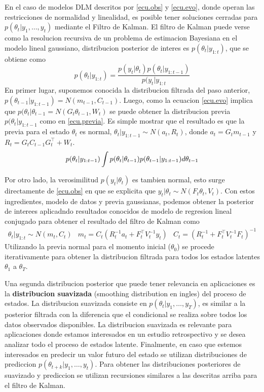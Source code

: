 \documentclass[12pt]{article}\usepackage[]{graphicx}\usepackage[]{color}
\begin{document}
En el caso de modelos DLM descritos por \eqref{ecu.obs} y \eqref{ecu.evo}, donde operan las restricciones de normalidad y linealidad, es posible tener soluciones cerradas para $p(\theta_t | y_1, \ldots, y_t)$ mediante el Filtro de Kalman. El filtro de Kalman puede verse como la resolucion recursiva de un problema de estimacion Bayesiana en el modelo lineal gaussiano, distribucion posterior de interes es $p(\theta_t | y_{1:t} )$, que se obtiene como
\[
p(\theta_t | y_{1:t}) = \frac{ p(y_t | \theta_t) p(\theta_{t} | y_{1:t-1})}{ p(y_t | y_{1:t}  }
\]
En primer lugar, suponemos conocida la distribucion filtrada del paso anterior, $p(\theta_{t-1} | y_{1:t-1}) = N(m_{t-1}, C_{t-1})$. Luego, como la ecuacion \eqref{ecu.evo} implica que $ p(\theta_{t} | \theta_{t-1} = N(G_t\theta_{t-1}, W_t)$ se puede obtener la distribucion previa $p(\theta_{t} | y_{1:t-1}$ como en \eqref{ecu.previa}. Es simple mostrar que el resultado es que la previa para el estado $\theta_t$ es normal, $\theta_t |y_{1:t-1} \sim N(a_t, R_t)$, donde $a_t = G_tm_{t-1}$ y $R_t = G_t C_{t-1} G_t^{\top} + W_t$. 
\begin{equation}
p(\theta_{t} | y_{1:t-1})  \int  p(\theta_{t} | \theta_{t-1}) p( \theta_{t-1}|y_{1:t-1}) d\theta_{t-1} \\
\label{ecu.previa}
\end{equation}

Por otro lado, la verosimilitud $p(y_t | \theta_t)$ es tambien normal, esto surge directamente de \eqref{ecu.obs} en que se explicita que $y_t | \theta_t \sim N(F_t \theta_t, V_t)$. Con estos ingredientes, modelo de datos y previa gaussianas, podemos obtener la posterior de interees aplicadndo resultados conocidos de modelo de regresion lineal conjugado para obtener el resultado del filtro de Kalman como 
\[\begin{array}{ccc}
\theta_t | y_{1:t} \sim N(m_t, C_t) & m_t = C_t( R_t^{-1}a_t + F_t^{\top}V_t^{-1}y_t ) & C_t = (R_t^{-1} + F_t^{\top}V_t^{-1}F_t)^{-1}
\end{array}
\]
Utilizando la previa normal para el momento inicial ($\theta_0$) se procede iterativamente para obtener la distribucion filtrada para todos los estados latentes $\theta_1$ a $\theta_T$. 

Una segunda distribucion posterior que puede tener relevancia en aplicaciones es la \textbf{distribucion suavizada} (smoothing distribution en ingles) del proceso de estados. La distribucion suavizada consiste en $p(\theta_t | y_1, \ldots, y_T)$, es similar a la posterior filtrada con la diferencia que el condicional se realiza sobre todos los datos observados disponibles. La distribucion suavizada es relevante para aplicaciones donde estamos interesados en un estudio retrospectivo y se desea analizar todo el proceso de estados latente. Finalmente, en caso que estemos interesados en predecir un valor futuro del estado se utilizan distribuciones de prediccion $p(\theta_{t+k} | y_1, \ldots, y_t)$. Para obtener las distribuciones posteriores de suavizado y prediccion se utilizan recursiones similares a las descritas arriba para el filtro de Kalman. 
\end{document}
